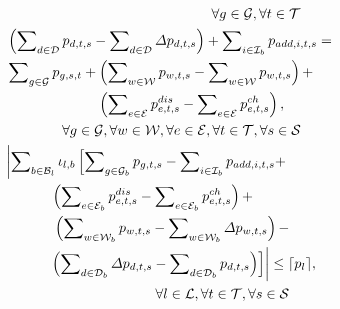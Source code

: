 \documentclass[lettersize,journal]{IEEEtran}
\begin{document}
\begin{subequations}
\begin{align}
		 & \qquad\qquad\qquad\qquad\qquad\qquad\qquad\,\,\,\,  \forall g\in\mathcal{G},\forall t\in\mathcal{T}                                                                                                                                       \\
		 & \left(\sum\nolimits_{d\in\mathcal{D}} p_{d,t,s} - \sum\nolimits_{d\in\mathcal{D}} \varDelta p_{d,t,s}\right) + \sum\nolimits_{i\in\mathcal{I}_{b}} p_{add, i,t,s}  = \notag                                                               \\
		 & \sum\nolimits_{g\in\mathcal{G}} p_{g,s,t} +  \left(\sum\nolimits_{w\in\mathcal{W}} p_{w,t,s} - \sum\nolimits_{w\in\mathcal{W}} p_{w,t,s}\right) + \notag                                                                                  \\
		 & \qquad\quad\quad\qquad\,\,\, \left(\sum\nolimits_{e\in\mathcal{E}} p_{e,t,s}^{dis} - \sum\nolimits_{e\in\mathcal{E}} p_{e,t,s}^{ch} \right), \notag                                                                                       \\
		 & \qquad\qquad \forall g\in\mathcal{G},\forall w\in\mathcal{W},\forall e\in\mathcal{E},\forall t\in\mathcal{T},\forall s\in\mathcal{S}                                                                                                      \\
		 & \biggl | \sum\nolimits_{b\in\mathcal{B}_{l}} \iota_{l,b} \left[ \sum\nolimits_{g\in\mathcal{G}_{b}} p_{g,t,s} - \sum\nolimits_{i\in\mathcal{I}_{b}} p_{add, i,t,s} + \right. \notag                                                       \\
		 & \qquad\quad\, \left(\sum\nolimits_{e\in\mathcal{E}_{b}} p_{e,t,s}^{dis} - \sum\nolimits_{e\in\mathcal{E}_{b}} p_{e,t,s}^{ch} \right) + \notag                                                                                             \\
		 & \qquad\quad\,\,\left(\sum\nolimits_{w\in\mathcal{W}_b} p_{w,t,s} - \sum\nolimits_{w\in\mathcal{W}_b} \varDelta p_{w,t,s} \right) -\notag                                                                                                  \\
		 & \qquad\quad \left. \left( \sum\nolimits_{d\in\mathcal{D}_b} \varDelta p_{d,t,s} - \sum\nolimits_{d\in\mathcal{D}_b} p_{d,t,s}\right) \right] \biggr |  \leq \lceil p_{l} \rceil , \notag                                                  \\
		 & \qquad\qquad\qquad\qquad\qquad\,\,\,\, \forall l\in\mathcal{L},\forall t\in\mathcal{T},\forall s\in\mathcal{S}                                                                                                                            \\

\end{align}
\end{subequations}
\end{document}
